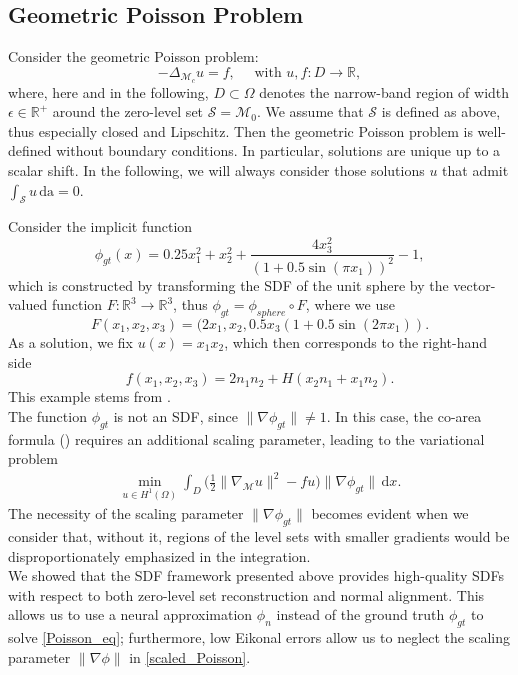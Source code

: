 \documentclass[12pt,openany]{book}
\newcommand{\R}{\mathbb{R}}
\def\S{\mathcal{S}}
\theoremstyle{plainnormal}
\theoremstyle{remark}
\begin{document}
\subsection{Geometric Poisson Problem}\label{section_PoissonPB}
Consider the geometric Poisson problem: \begin{equation}\label{Poisson_eq}
    -\Delta_{\mathcal{M}_c} u = f,\quad \text{ with }
    u,f: D \rightarrow \R, 
\end{equation} 
where, here and in the following, $ D\subset \Omega$ denotes the narrow-band region of width $\epsilon \in\R^+$ around the zero-level set $\S =\mathcal{M}_{ 0}$. We assume that $\mathcal S$ is defined as above, thus especially closed and Lipschitz. Then the geometric Poisson problem is well-defined without boundary conditions. In particular, solutions are unique up to a scalar shift. In the following, we will always consider those solutions $u$ that admit $\int_\S u\, \mathrm{da} = 0$. 
\par
Consider the implicit function 
$$\phi_{gt}(x) = 0.25x_1^2 + x_2^2 + \frac{4x_3^2}{(1+0.5\sin(\pi x_1))^2} - 1,$$
which is constructed by transforming the SDF of the unit sphere by the vector-valued function $F: \R^3 \rightarrow \R^3$, thus $\phi_{gt} = \phi_{sphere} \circ F$, where we use $$F(x_1, x_2,x_3) = (2x_1, x_2, 0.5x_3(1+0.5\sin(2\pi x_1)).$$
As a solution, we fix $u(x) = x_1x_2$, which then corresponds to the right-hand side $$f(x_1, x_2, x_3) = 2n_1n_2 + H(x_2n_1 + x_1n_2).$$ This example stems from \cite{Dziuk_Elliott_2013}.\\
The function $\phi_{gt}$ is not an SDF, since $\|\nabla\phi_{gt}\| \neq 1$. In this case, the co-area formula () requires an additional scaling parameter, leading to the variational problem 
\begin{align}
    \min_{u\in H^1(\Omega)}\int_D \Big(\frac{1}{2}\|\nabla_\mathcal{M}u\|^2 - fu\Big) \|\nabla \phi_{gt}\| \,\mathrm{d}x.\label{scaled_Poisson}
\end{align}
The necessity of the scaling parameter $\|\nabla\phi_{gt}\|$ becomes evident when we consider that, without it, regions of the level sets with smaller gradients would be disproportionately emphasized in the integration.\\
We showed that the SDF framework presented above provides high-quality SDFs with respect to both zero-level set reconstruction and normal alignment. This allows us to use a neural approximation $\phi_n$ instead of the ground truth $\phi_{gt}$ to solve \cref{Poisson_eq}; furthermore, low Eikonal errors allow us to neglect the scaling parameter $\|\nabla \phi\|$ in \cref{scaled_Poisson}. \par
\end{document}
